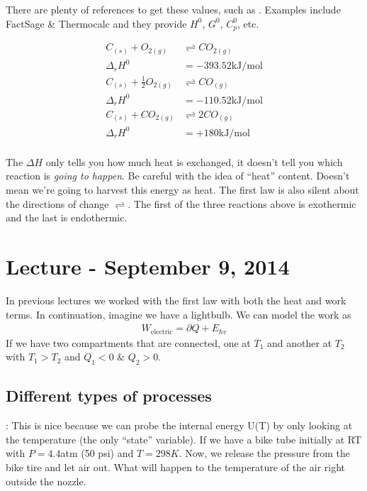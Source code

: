 \documentclass[12pt]{article}
\begin{document}
There are plenty of references to get these values, such as .  Examples include FactSage \& Thermocalc and they provide $H^0$, $G^0$, $C_p^0$, etc.

\begin{align*}
C_{(s)} + O_{2 (g)} &\rightleftharpoons CO_{2 (g)}\\
\Delta_r H^0 &= -393.52 \text{kJ}/\text{mol}\\
C_{(s)} + \frac{1}{2} O_{2 (g)} &\rightleftharpoons CO_{(g)}\\
\Delta_r H^0 &= -110.52 \text{kJ}/\text{mol}\\
C_{(s)} + CO_{2 (g)} &\rightleftharpoons 2 CO_{(g)}\\
\Delta_r H^0 &= +180 \text{kJ}/\text{mol}\\
\end{align*}

The $\Delta H$ only tells you how much heat is exchanged, it doesn't tell you which reaction is \emph{going to happen}.  Be careful with the idea of ``heat'' content.  Doesn't mean we're going to harvest this energy as heat.  The first law is also silent about the directions of change $\rightleftharpoons$.  The first of the three reactions above is exothermic and the last is endothermic.

\section{Lecture - September 9, 2014}
In previous lectures we worked with the first law with both the heat and work terms.  In continuation, imagine we have a lightbulb.  We can model the work as
\begin{align*}
W_\text{electric} = \partial Q + E_{\hbar v}
\end{align*}
If we have two compartments that are connected, one at $T_1$ and another at $T_2$ with $T_1 > T_2$ and $Q_1 < 0$ \& $Q_2 > 0$.

\subsection{Different types of processes}
:  This is nice because we can probe the internal energy U(T) by only looking at the temperature (the only ``state'' variable).  If we have a bike tube initially at RT with $P=4.4$atm (50 psi) and $T=298K$.  Now, we release the pressure from the bike tire and let air out.  What will happen to the temperature of the air right outside the nozzle.\\
\end{document}
